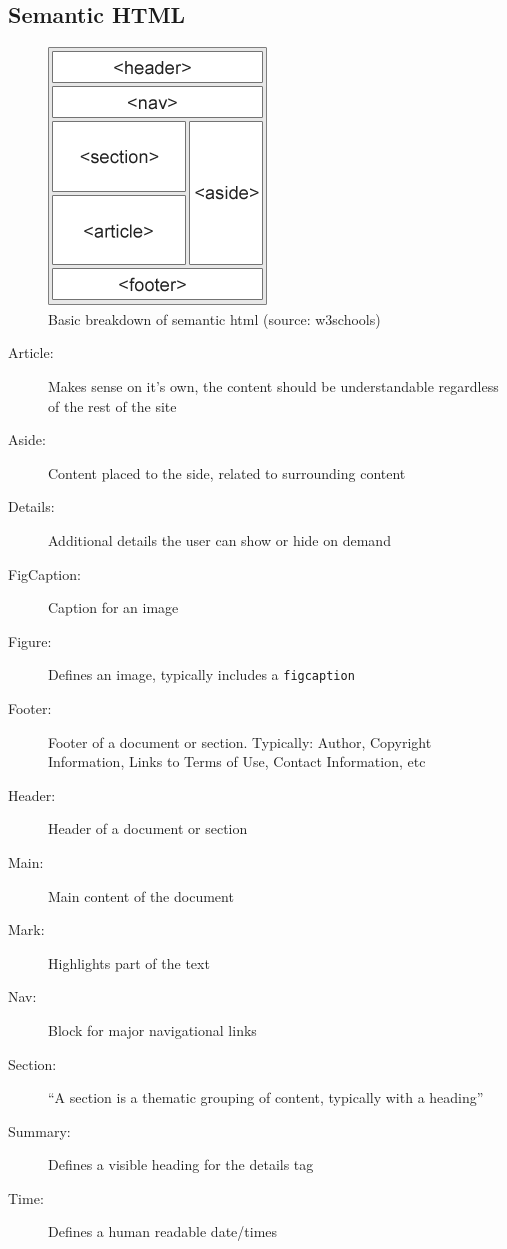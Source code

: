 \documentclass[12pt, a4paper]{article}
\begin{document}
	\pagestyle{fancy}
	\begin{multicols*}{2}
		\tableofcontents
		
		\section{Semantic HTML}
		\begin{figure}[H]
			\centering
			\includegraphics[width=0.7\linewidth]{img_sem_elements}
			\caption{Basic breakdown of semantic html (source: w3schools)}	
		\end{figure}
	
		\begin{description}
			\item[Article:] Makes sense on it's own, the content should be understandable regardless of the rest of the site
			\item[Aside:] Content placed to the side, related to surrounding content
			\item[Details:] Additional details the user can show or hide on demand
			\item[FigCaption:] Caption for an image
			\item[Figure:] Defines an image, typically includes a \texttt{figcaption}
			\item[Footer:] Footer of a document or section. Typically: Author, Copyright Information, Links to Terms of Use, Contact Information, etc
			\item[Header:] Header of a document or section
			\item[Main:] Main content of the document
			\item[Mark:] Highlights part of the text
			\item[Nav:] Block for major navigational links
			\item[Section:] ``A section is a thematic grouping of content, typically with a heading''
			\item[Summary:] Defines a visible heading for the details tag
			\item[Time:] Defines a human readable date/times
		\end{description}
		

\end{multicols*}
\end{document}
